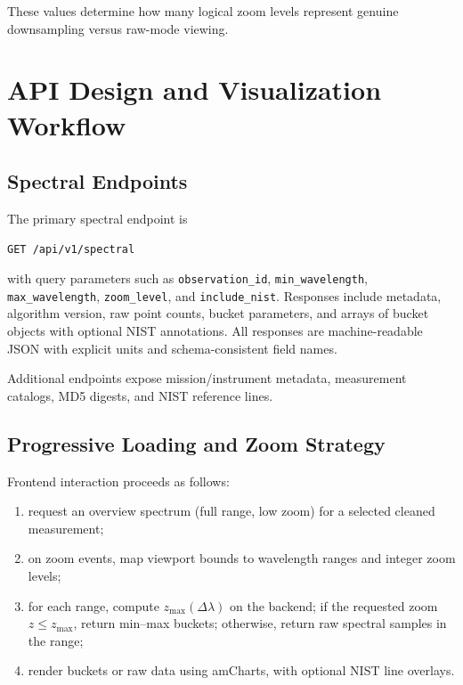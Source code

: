 \documentclass[12pt,a4paper]{article}
\begin{document}
These values determine how many logical zoom levels represent genuine downsampling versus raw-mode viewing.

\section{API Design and Visualization Workflow}
\label{sec:api}

\subsection{Spectral Endpoints}

The primary spectral endpoint is
\begin{verbatim}
GET /api/v1/spectral
\end{verbatim}
with query parameters such as \texttt{observation\_id}, \texttt{min\_wavelength}, \texttt{max\_wavelength}, \texttt{zoom\_level}, and \texttt{include\_nist}. Responses include metadata, algorithm version, raw point counts, bucket parameters, and arrays of bucket objects with optional NIST annotations. All responses are machine-readable JSON with explicit units and schema-consistent field names.

Additional endpoints expose mission/instrument metadata, measurement catalogs, MD5 digests, and NIST reference lines.

\subsection{Progressive Loading and Zoom Strategy}

Frontend interaction proceeds as follows:

\begin{enumerate}[nosep]
  \item request an overview spectrum (full range, low zoom) for a selected cleaned measurement;
  \item on zoom events, map viewport bounds to wavelength ranges and integer zoom levels;
  \item for each range, compute \(z_{\max}(\Delta\lambda)\) on the backend; if the requested zoom \(z\le z_{\max}\), return min--max buckets; otherwise, return raw spectral samples in the range;
  \item render buckets or raw data using amCharts, with optional NIST line overlays.
\end{enumerate}
\end{document}
